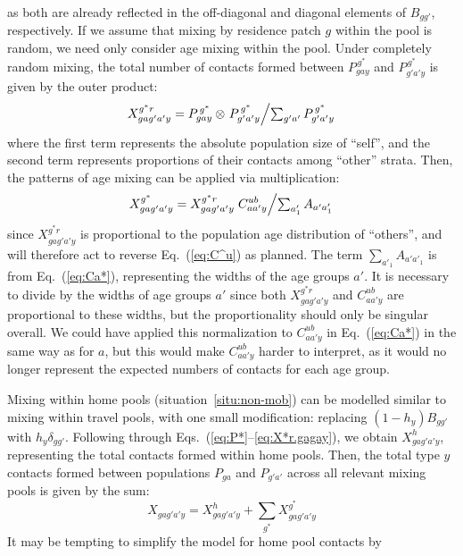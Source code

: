 as both are already reflected in the off-diagonal and diagonal elements of $B_{gg'}$, respectively.
If we assume that mixing by residence patch $g$ within the pool is random,
we need only consider age mixing within the pool.
Under completely random mixing,
the total number of contacts formed between $P^{\,g^*}_{gay}$ and $P^{\,g^*}_{g'a'y}$
is given by the outer product:
\begin{equation}\label{eq:X*r.gagay}
  X^{g^*r}_{gag'a'y} = P^{\,g^*}_{gay} \otimes
    \left. P^{\,g^*}_{g'a'y} \middle/ \textstyle\sum_{g'a'} P^{\,g^*}_{g'a'y}\right.
\end{equation}
where the first term represents the absolute population size of ``self'',
and the second term represents proportions of their contacts among ``other'' strata.
Then, the patterns of age mixing can be applied via multiplication:
\begin{equation}\label{eq:X*.gagay}
  X^{g^*}_{gag'a'y} = X^{g^*r}_{gag'a'y}
    \left.C^{ub}_{aa'y} \middle/ \textstyle\sum_{a'_1} A_{a'a'_1}\right.
\end{equation}
since $X^{g^*r}_{gag'a'y}$ is proportional to the population age distribution of ``others'',
and will therefore act to reverse Eq.~(\ref{eq:C^u}) as planned.
The term $\sum_{a'_1} A_{a'a'_1}$ is from Eq.~(\ref{eq:Ca*}),
representing the widths of the age groups $a'$.
It is necessary to divide by the widths of age groups $a'$ since
both $X^{g^*r}_{gag'a'y}$ and $C^{ub}_{aa'y}$ are proportional to these widths,
but the proportionality should only be singular overall.
We could have applied this normalization to $C^{ub}_{aa'y}$
in Eq.~(\ref{eq:Ca*}) in the same way as for $a$,
but this would make $C^{ub}_{aa'y}$ harder to interpret,
as it would no longer represent the expected numbers of contacts for each age group.
\par
Mixing within home pools (situation~\ref{situ:non-mob})
can be modelled similar to mixing within travel pools,
with one small modification: replacing $(1-h_y) B_{gg'}$ with $h_y \delta_{gg'}$.
Following through Eqs.~(\ref{eq:P*}--\ref{eq:X*r.gagay}), we obtain $X^{h}_{gag'a'y}$,
representing the total contacts formed within home pools.
Then, the total type $y$ contacts formed between populations $P_{ga}$ and $P_{g'a'}$
across all relevant mixing pools is given by the sum:
\begin{equation}\label{eq:Xgagay}
  X_{gag'a'y} = X^h_{gag'a'y} + \sum_{g^*} X^{g^*}_{gag'a'y}
\end{equation}
It may be tempting to simplify the model for home pool contacts by
